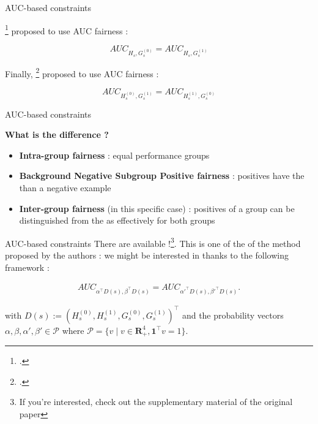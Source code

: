 \begin{frame}{AUC-based constraints}
    
    \citeauthor{borkan2019nuanced}\footcite{borkan2019nuanced} proposed to use  AUC fairness :

    \begin{equation}
        AUC_{H_s,G_s^{(0)}} = AUC_{H_s,G_s^{(1)}}
    \end{equation}
    
    Finally, \citeauthor{kallus2019fairness}\footcite{kallus2019fairness} proposed to use  AUC fairness :

    \begin{equation}
        AUC_{H_s^{(0)},G_s^{(1)}} = AUC_{H_s^{(1)},G_s^{(0)}}
    \end{equation}

\end{frame}
    

\begin{frame}{AUC-based constraints}


    {\large\textbf{What is the difference ?}}
    \begin{itemize}
        \item \textbf{Intra-group fairness} : equal performance  groups
        \item \textbf{Background Negative Subgroup Positive fairness} : positives  have the  than a negative example
        \item \textbf{Inter-group fairness} (in this specific case) : positives of a group can be distinguished from the  as effectively for both groups
    \end{itemize}


\end{frame}


\begin{frame}{AUC-based constraints}
    There are  available !\footnote{If you're interested, check out the supplementary material of the original paper}. This is one of the  of the method proposed by the authors :  we might be interested in thanks to the following framework :

    \begin{align} \label{eq:auc-based-constraints-general}
        AUC_{\alpha^\top D(s), \beta^\top D(s)} = AUC_{\alpha'^\top D(s),
        \beta'^\top D(s)}.
    \end{align}

    with $ D(s) := (H^{(0)}_s, H^{(1)}_s, G^{(0)}_s, G^{(1)}_s)^\top$ and the probability vectors $\alpha, \beta, \alpha', \beta' \in  \mathcal{P}$ where $\mathcal{P} = \{ v \mid v \in \mathbf{R}_+^4, \mathbf{1}^\top v = 1 \}$.

\end{frame}


